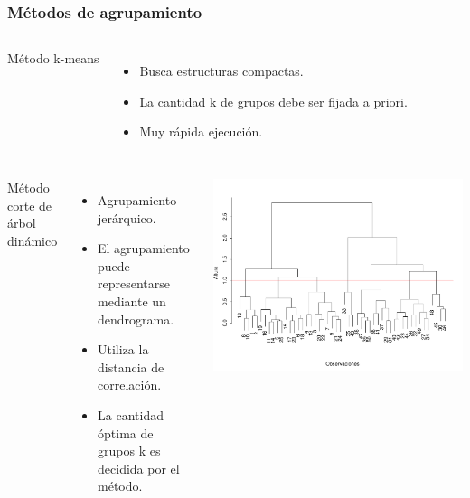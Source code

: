 \documentclass[serif,9pt, t]{beamer}
\begin{document}
\begin{frame}\frametitle{Métodos de agrupamiento} 

\begin{columns}[T]
Método k-means
\begin{itemize}
	\item Busca estructuras compactas.
	\item La cantidad k de grupos debe ser fijada a priori.  
	\item Muy rápida ejecución. 	
\end{itemize}
\end{columns}
\bigskip
\bigskip
\begin{columns}[T]
Método corte de árbol dinámico
\begin{itemize}
	\item Agrupamiento jerárquico.
	\item El agrupamiento puede representarse mediante un dendrograma.
	\item Utiliza la distancia de correlación.
	\item La cantidad óptima de grupos k es decidida por el método.
\end{itemize}			
    \centering
    \includegraphics[width=1\textwidth]{dendrograma_muestra.pdf}
\end{columns}
\end{frame}
\end{document}
